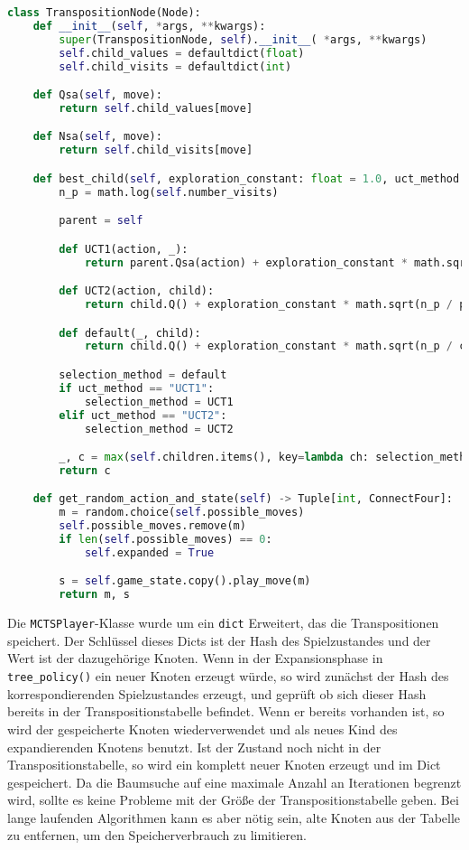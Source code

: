 \begin{lstlisting}[language=Python,label={lst:transpos-node}]
class TranspositionNode(Node):
    def __init__(self, *args, **kwargs):
        super(TranspositionNode, self).__init__( *args, **kwargs)
        self.child_values = defaultdict(float)
        self.child_visits = defaultdict(int)

    def Qsa(self, move):
        return self.child_values[move]

    def Nsa(self, move):
        return self.child_visits[move]

    def best_child(self, exploration_constant: float = 1.0, uct_method: str = "UCT") -> "Node":
        n_p = math.log(self.number_visits)

        parent = self

        def UCT1(action, _):
            return parent.Qsa(action) + exploration_constant * math.sqrt(n_p / parent.Nsa(action))

        def UCT2(action, child):
            return child.Q() + exploration_constant * math.sqrt(n_p / parent.Nsa(action))

        def default(_, child):
            return child.Q() + exploration_constant * math.sqrt(n_p / child.number_visits)

        selection_method = default
        if uct_method == "UCT1":
            selection_method = UCT1
        elif uct_method == "UCT2":
            selection_method = UCT2

        _, c = max(self.children.items(), key=lambda ch: selection_method(*ch))
        return c

    def get_random_action_and_state(self) -> Tuple[int, ConnectFour]:
        m = random.choice(self.possible_moves)
        self.possible_moves.remove(m)
        if len(self.possible_moves) == 0:
            self.expanded = True

        s = self.game_state.copy().play_move(m)
        return m, s
\end{lstlisting}

Die \verb|MCTSPlayer|-Klasse wurde um ein \verb|dict| Erweitert, das die Transpositionen speichert.
Der Schlüssel dieses Dicts ist der Hash des Spielzustandes und der Wert ist der dazugehörige Knoten.
Wenn in der Expansionsphase in \verb|tree_policy()| ein neuer Knoten erzeugt würde, so wird zunächst der Hash des korrespondierenden Spielzustandes erzeugt, und geprüft ob sich dieser Hash bereits in der Transpositionstabelle befindet.
Wenn er bereits vorhanden ist, so wird der gespeicherte Knoten wiederverwendet und als neues Kind des expandierenden Knotens benutzt.
Ist der Zustand noch nicht in der Transpositionstabelle, so wird ein komplett neuer Knoten erzeugt und im Dict gespeichert.
Da die Baumsuche auf eine maximale Anzahl an Iterationen begrenzt wird, sollte es keine Probleme mit der Größe der Transpositionstabelle geben.
Bei lange laufenden Algorithmen kann es aber nötig sein, alte Knoten aus der Tabelle zu entfernen, um den Speicherverbrauch zu limitieren.

